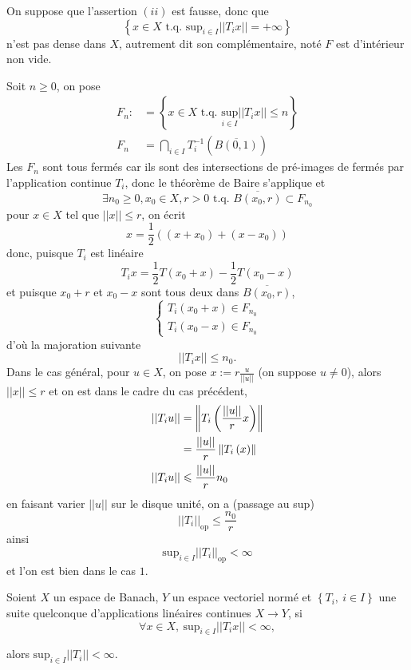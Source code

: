 \documentclass[a4paper,11pt, twoside]{article}
\begin{document}
\begin{Proof}
  On suppose que l'assertion $(ii)$ est fausse, donc que 
  $$\left\{x\in X\text{ t.q. } \mathrm{sup}_{i\in I}||T_ix||=+\infty\right\}$$ 
  n'est pas dense dans $X$, autrement dit son complémentaire, noté $F$ est d'intérieur non vide.

  Soit $n\geqslant 0$, on pose 
  \begin{align*}
    F_n:&=\left\{x\in X\text{ t.q. }\underset{i\in I}{\mathrm{sup}}||T_ix||\leqslant n\right\}\\
    F_n&=\bigcap_{i\in I}T_i^{-1}\left(\overline{B(0,1)}\right)
  \end{align*}
  Les $F_n$ sont tous fermés car ils sont des intersections de pré-images de fermés par l'application continue $T_i$, donc le théorème de Baire s'applique et 
  $$\exists n_0\geqslant 0, x_0\in X, r>0\text{ t.q. }\overline{B(x_0,r)}\subset F_{n_0}$$
  pour $x\in X$ tel que $||x||\leqslant r$, on écrit
  $$x=\frac12\left((x+x_0)+(x-x_0)\right)$$
  donc, puisque $T_i$ est linéaire
  $$T_ix=\frac12T(x_0+x)-\frac12T(x_0-x)$$
  et puisque $x_0+r$ et $x_0-x$ sont tous deux dans $\overline{B(x_0,r)}$, 
  $$\left\{\begin{array}{l}
    T_i(x_0+x)\in F_{n_0}\\
    T_i(x_0-x)\in F_{n_0}
  \end{array}\right.$$
  d'où la majoration suivante 
  $$||T_ix||\leqslant n_0.$$
  Dans le cas général, pour $u\in X$, on pose $x:=r\frac{u}{||u||}$ (on suppose $u\neq 0$), alors $||x||\leqslant r$ et on est dans le cadre du cas précédent, 
  \begin{align*}
    ||T_iu||&=\left\lVert T_i\left(\frac{||u||}{r}x\right)\right\rVert\\
    &=\frac{||u||}{r}\left\lVert T_i\left(x\right)\right\rVert\\
    ||T_iu||&\leqslant \frac{||u||}{r} n_0
  \end{align*}
  en faisant varier $||u||$ sur le disque unité, on a (passage au sup)
  $$||T_i||_{\mathrm{op}}\leqslant \frac{n_0}{r}$$
  ainsi 
  $$\mathrm{sup}_{i\in I}||T_i||_{\mathrm{op}}<\infty$$
  et l'on est bien dans le cas $\mathit 1$.
\end{Proof}


\begin{corollaire}
  Soient $X$ un espace de Banach, $Y$ un espace vectoriel normé et $\left\{T_i,\ i\in I\right\}$ une suite quelconque d'applications linéaires continues $X\longrightarrow Y$, si 
  $$\forall x\in X,\ \mathrm{sup}_{i\in I}||T_ix||<\infty,$$

  alors $\mathrm{sup}_{i\in I}||T_i||<\infty.$
\end{corollaire}
\end{document}
